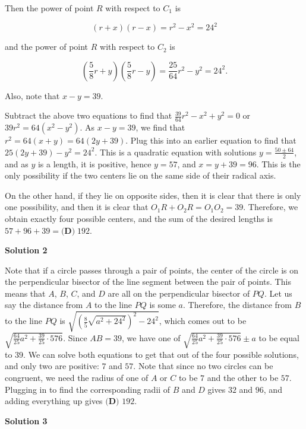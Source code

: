 \begin{enumerate}
 Then the power of point $R$ with respect to $C_1$ is

 
 \[(r+x)(r-x) = r^2 - x^2 = 24^2\]

 and the power of point $R$ with respect to $C_2$ is

 
 \[\left(\frac{5}{8}r + y\right) \left(\frac{5}{8}r - y\right) = \frac{25}{64}r^2 - y^2 = 24^2.\]

 Also, note that $x-y=39$.

 Subtract the above two equations to find that $\frac{39}{64}r^2 - x^2 + y^2 = 0$ or $39 r^2 = 64(x^2-y^2)$. As $x-y=39$, we find that $r^2=64(x+y) = 64(2y+39)$. Plug this into an earlier equation to find that $25(2y+39)-y^2=24^2$. This is a quadratic equation with solutions $y=\frac{50 \pm 64}{2}$, and as $y$ is a length, it is positive, hence $y=57$, and $x=y+39=96$. This is the only possibility if the two centers lie on the same side of their radical axis.

 On the other hand, if they lie on opposite sides, then it is clear that there is only one possibility, and then it is clear that $O_1 R + O_2 R = O_1 O_2 = 39$. Therefore, we obtain exactly four possible centers, and the sum of the desired lengths is $57+96+39 = \boxed{\textbf{(D)}\; 192}$.

 



\textbf{Solution 2}

Note that if a circle passes through a pair of points, the center of the circle is on the perpendicular bisector of the line segment between the pair of points. This means that $A$, $B$, $C$, and $D$ are all on the perpendicular bisector of $PQ$. Let us say the distance from $A$ to the line $PQ$ is some $a$. Therefore, the distance from $B$ to the line $PQ$ is $\sqrt{(\frac{8}{5}\sqrt{a^2 + 24^2})^2 - 24^2}$, which comes out to be $\sqrt{\frac{64}{25}a^2 + \frac{39}{25}\cdot 576}$. Since $AB = 39$, we have one of $\sqrt{\frac{64}{25}a^2 + \frac{39}{25}\cdot 576} \pm a$ to be equal to $39$. We can solve both equations to get that out of the four possible solutions, and only two are positive: $7$ and $57$. Note that since no two circles can be congruent, we need the radius of one of $A$ or $C$ to be $7$ and the other to be $57$. Plugging in to find the corresponding radii of $B$ and $D$ gives $32$ and $96$, and adding everything up gives $\boxed{\textbf{(D) }192}$.

 



\textbf{Solution 3}


\end{enumerate}
